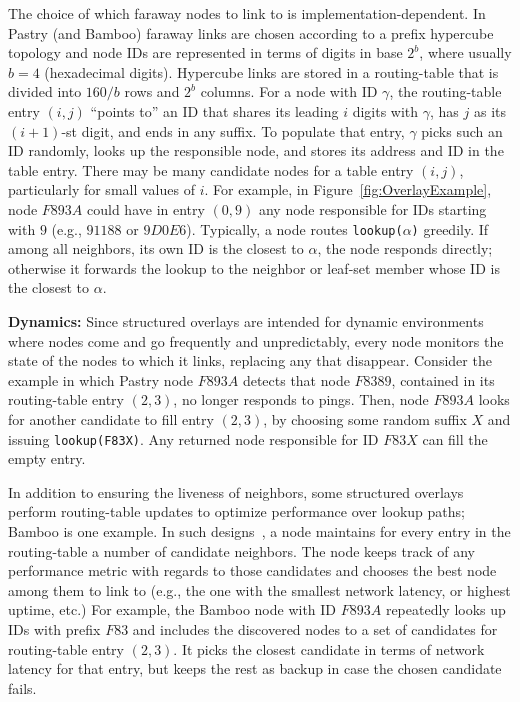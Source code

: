 \documentclass[10pt,twocolumn]{article}
\renewcommand{\paragraph}[1]{\textbf{#1:}}
\begin{document}
The choice of
which faraway nodes to link to is implementation-dependent.  In Pastry (and Bamboo) faraway links are
chosen according to a prefix hypercube topology and
node IDs are represented in terms of digits in base $2^b$, where usually
$b=4$ (hexadecimal
digits).  Hypercube links are stored in
a routing-table that is divided into $160/b$ rows and
$2^b$ columns.  
For a node with ID $\gamma$, the routing-table
entry $(i, j)$ ``points to'' an ID that shares its leading $i$ digits
with $\gamma$, has $j$ as its $(i+1)$-st digit, and ends in any suffix. 
To populate that entry, $\gamma$ picks such an ID randomly, looks up the responsible
node, and stores its address and ID in the table entry.  There may be many candidate nodes for
a table entry $(i, j)$,
particularly for small values of $i$.  For example, in
Figure~\ref{fig:OverlayExample}, node $F893A$ could have in entry
$(0,9)$ any node
responsible for IDs starting with $9$ (e.g., $91188$ or $9D0E6$).
Typically, a node routes {\tt lookup($\alpha$)} greedily.  If among all
neighbors, its own ID is the closest to $\alpha$, the node responds
directly; otherwise it forwards the lookup to the neighbor or
leaf-set member whose ID is the closest to $\alpha$.

\paragraph{Dynamics}
Since structured overlays are intended for dynamic environments where nodes come and
go frequently and unpredictably, every node monitors the state of
the nodes to which it links, replacing any that disappear.
Consider the example in which Pastry node $F893A$ detects that
node $F8389$, contained in its routing-table entry $(2,3)$, no longer 
responds to pings.  Then, node $F893A$ looks for another candidate to
fill entry $(2,3)$, by choosing some random suffix $X$ and issuing  
{\tt lookup(F83X)}. Any
returned node responsible for ID $F83X$ can fill the empty entry.
 
In addition to ensuring the liveness of neighbors,
some structured overlays perform routing-table updates  to optimize
performance over lookup paths; Bamboo
is one example.  In such
designs~\cite{Gummadi2003b,Rhea2004}, a node maintains for every entry in
the routing-table a number of candidate neighbors.  
The node keeps track of any performance metric with regards to those
candidates and chooses the 
best node among them to link to (e.g., the one with the smallest network 
latency, or highest uptime, etc.)  For example, the Bamboo node with ID
$F893A$ repeatedly looks up IDs with prefix $F83$ and includes the discovered
nodes to a set of candidates for routing-table entry $(2,3)$.  It picks
the closest candidate in terms of network latency for that entry, but keeps 
the rest as backup in case the chosen candidate fails.
\end{document}
